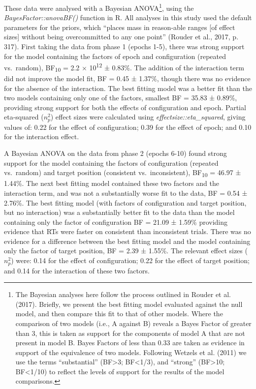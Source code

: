 \documentclass[
  man,floatsintext]{apa7}
\begin{document}
These data were analysed with a Bayesian ANOVA\footnote{The Bayesian analyses here follow the process outlined in Rouder et al. (2017). Briefly, we present the best fitting model evaluated against the null model, and then compare this fit to that of other models. Where the comparison of two models (i.e., A against B) reveals a Bayes Factor of greater than 3, this is taken as support for the components of model A that are not present in model B. Bayes Factors of less than 0.33 are taken as evidence in support of the equivalence of two models. Following Wetzels et al. (2011) we use the terms ``substantial'' (BF\textgreater3; BF\textless1/3), and ``strong'' (BF\textgreater10; BF\textless1/10) to reflect the levels of support for the results of the model comparisons.}, using the \emph{BayesFactor::anovaBF()} function in R. All analyses in this study used the default parameters for the priors, which ``places mass in reason-able ranges {[}of effect sizes{]} without being overcommitted to any one point'' (Rouder et al., 2017, p. 317). First taking the data from phase 1 (epochs 1-5), there was strong support for the model containing the factors of epoch and configuration (repeated vs.~random), BF\textsubscript{10} = 2.2 × 10\textsuperscript{12} ± 0.83\%. The addition of the interaction term did not improve the model fit, BF = 0.45 ± 1.37\%, though there was no evidence for the absence of the interaction. The best fitting model was a better fit than the two models containing only one of the factors, smallest BF = 35.83 ± 0.89\%, providing strong support for both the effects of configuration and epoch. Partial eta-squared (\(n^2_p\)) effect sizes were calculated using \emph{effectsize::eta\_squared}, giving values of: 0.22 for the effect of configuration; 0.39 for the effect of epoch; and 0.10 for the interaction effect.

A Bayesian ANOVA on the data from phase 2 (epochs 6-10) found strong support for the model containing the factors of configuration (repeated vs.~random) and target position (consistent vs.~inconsistent), BF\textsubscript{10} = 46.97 ± 1.44\%. The next best fitting model contained these two factors and the interaction term, and was not a substantially worse fit to the data, BF = 0.54 ± 2.76\%. The best fitting model (with factors of configuration and target position, but no interaction) was a substantially better fit to the data than the model containing only the factor of configuration BF = 21.09 ± 1.59\% providing evidence that RTs were faster on consistent than inconsistent trials. There was no evidence for a difference between the best fitting model and the model containing only the factor of target position, BF = 2.39 ± 1.55\%. The relevant effect sizes (\(n^2_p\)) were: 0.14 for the effect of configuration; 0.22 for the effect of target position; and 0.14 for the interaction of these two factors.
\end{document}
